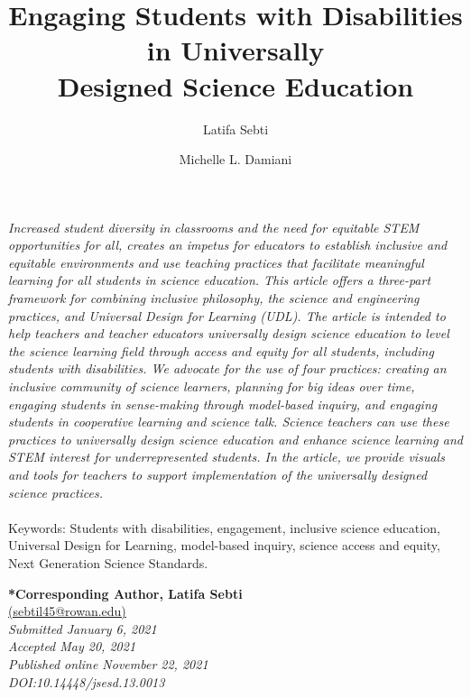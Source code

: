 \documentclass[11.5pt]{sig-alternate}
\makeatletter
\let\oldabstract\abstract
\let\oldendabstract\endabstract
\renewenvironment{abstract}
{\renewenvironment{quotation}%
               {\list{}{\addtolength{\leftmargin}{1em} %
                        \listparindent 1.5em%
                        \itemindent    \listparindent%
                        \rightmargin   \leftmargin%
                        \parsep        \z@ \@plus\p@}%
                \item\relax}%
               {\endlist}%
\oldabstract}
{\oldendabstract}
\makeatother
\begin{document}
\title{Engaging Students with Disabilities in Universally\\
Designed Science Education}

\author[1]{\large \color{blue}Latifa Sebti}
\author[1]{\large \color{blue}Michelle L. Damiani}

\toappear{}
\maketitle
\begin{@twocolumnfalse} 
\begin{abstract}
\item 
 \textit {Increased student diversity in classrooms and the need for equitable STEM
opportunities for all, creates an impetus for educators to establish inclusive and equitable
environments and use teaching practices that facilitate meaningful learning for all students in
science education. This article offers a three-part framework for combining inclusive philosophy,
the science and engineering practices, and Universal Design for Learning (UDL). The article
is intended to help teachers and teacher educators universally design science education to
level the science learning field through access and equity for all students, including students
with disabilities. We advocate for the use of four practices: creating an inclusive community of
science learners, planning for big ideas over time, engaging students in sense-making through
model-based inquiry, and engaging students in cooperative learning and science talk. Science
teachers can use these practices to universally design science education and enhance science
learning and STEM interest for underrepresented students. In the article, we provide visuals
and tools for teachers to support implementation of the universally designed science practices.}
     \\
     \\
     Keywords: Students with disabilities, engagement, inclusive science education, Universal
Design for Learning, model-based inquiry, science access and equity, Next Generation Science
Standards.
\end{abstract}
\end{@twocolumnfalse}






\textbf{*Corresponding Author, Latifa Sebti}\\
\href{mailto: sebtil45@rowan.edu }{(sebtil45@rowan.edu)} \\
\textit{Submitted January 6, 2021 }\\
\textit{Accepted May 20, 2021} \\
\textit{Published online November 22, 2021} \\
\textit{DOI:10.14448/jsesd.13.0013} \\
\pagebreak
\pagebreak
\end{document}
